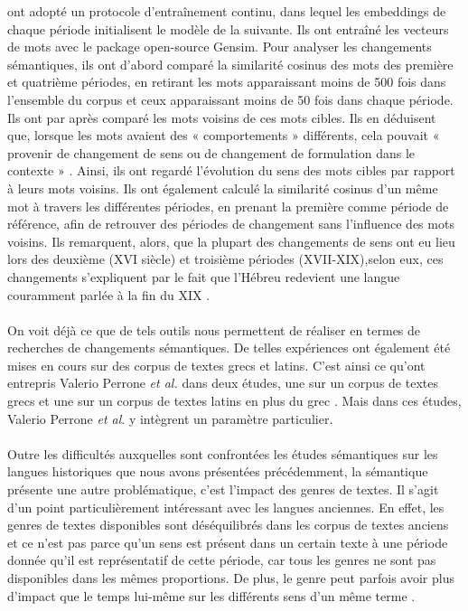 \documentclass{article}
\begin{document}
ont adopté un protocole d’entraînement continu, dans lequel les embeddings de chaque période initialisent le modèle de la suivante. Ils ont entraîné les vecteurs de mots avec le package open-source Gensim. Pour analyser les changements sémantiques, ils ont d’abord comparé la similarité cosinus des mots des première et quatrième périodes, en retirant les mots apparaissant moins de 500 fois dans l’ensemble du corpus et ceux apparaissant moins de 50 fois dans chaque période. Ils ont par après comparé les mots voisins de ces mots cibles. Ils en déduisent que, lorsque les mots avaient des « comportements » différents, cela pouvait « provenir de changement de sens ou de changement de formulation dans le contexte » \cite[p. 15]{liebeskind2020deep}. Ainsi, ils ont regardé l’évolution du sens des mots cibles par rapport à leurs mots voisins. Ils ont également calculé la similarité cosinus d’un même mot à travers les différentes périodes, en prenant la première comme période de référence, afin de retrouver des périodes de changement sans l’influence des mots voisins. Ils remarquent, alors, que la plupart des changements de sens ont eu lieu lors des deuxième (XVI siècle) et troisième périodes (XVII-XIX),selon eux, ces changements s’expliquent par le fait que l’Hébreu redevient une langue couramment parlée à la fin du XIX \cite{liebeskind2020deep}. 
\paragraph{}
On voit déjà ce que de tels outils nous permettent de réaliser en termes de recherches de changements sémantiques. De telles expériences ont également été mises en cours sur des corpus de textes grecs et latins. C’est ainsi ce qu’ont entrepris Valerio Perrone \textit{et al.} dans deux études, une sur un corpus de textes grecs \cite{perrone2019gasc} et une sur un corpus de textes latins en plus du grec \cite{perrone2021lexical}. Mais dans ces études, Valerio Perrone \textit{et al}. y intègrent un paramètre particulier. 
\paragraph{}
Outre les difficultés auxquelles sont confrontées les études sémantiques sur les langues historiques que nous avons présentées précédemment, la sémantique présente une autre problématique, c’est l’impact des genres de textes. Il s’agit d’un point particulièrement intéressant avec les langues anciennes. En effet, les genres de textes disponibles sont déséquilibrés dans les corpus de textes anciens \cite[p. 1]{perrone2019gasc} et ce n’est pas parce qu’un sens est présent dans un certain texte à une période donnée qu’il est représentatif de cette période, car tous les genres ne sont pas disponibles dans les mêmes proportions. De plus, le genre peut parfois avoir plus d’impact que le temps lui-même sur les différents sens d’un même terme \cite[p. 2]{perrone2019gasc}. 
\end{document}
